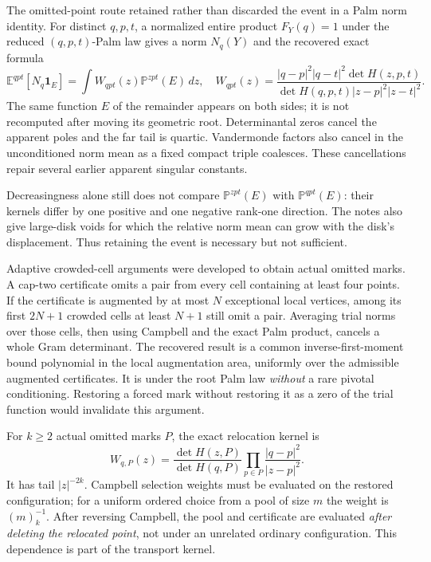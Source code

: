 \documentclass[11pt,a4paper]{article}
\theoremstyle{definition}
\theoremstyle{remark}
\numberwithin{equation}{section}
\begin{document}
The omitted-point route retained rather than discarded the event in a
Palm norm identity.  For distinct $q,p,t$, a normalized entire product
$F_Y(q)=1$ under the reduced $(q,p,t)$-Palm law gives a norm $N_q(Y)$
and the recovered exact formula
\begin{equation}
 \mathbb E^{qpt}[N_q\mathbf1_E]
 =\int W_{qpt}(z)\mathbb P^{zpt}(E)\,dz,
 \quad
 W_{qpt}(z)=
 \frac{|q-p|^2|q-t|^2\det H(z,p,t)}
      {\det H(q,p,t)|z-p|^2|z-t|^2}.
 \label{br:weighted-norm}
\end{equation}
The same function $E$ of the remainder appears on both sides; it is
not recomputed after moving its geometric root.  Determinantal zeros
cancel the apparent poles and the far tail is quartic.  Vandermonde
factors also cancel in the unconditioned norm mean as a fixed compact
triple coalesces.  These cancellations repair several earlier apparent
singular constants.

Decreasingness alone still does not compare
$\mathbb P^{zpt}(E)$ with $\mathbb P^{qpt}(E)$: their kernels differ
by one positive and one negative rank-one direction.  The notes also
give large-disk voids for which the relative norm mean can grow with
the disk's displacement.  Thus retaining the event is necessary but
not sufficient.

Adaptive crowded-cell arguments were developed to obtain actual omitted
marks.  A cap-two certificate omits a pair from every cell containing at
least four points.  If the certificate is augmented by at most $N$
exceptional local vertices, among its first $2N+1$ crowded cells at least
$N+1$ still omit a pair.  Averaging trial norms over those cells, then
using Campbell and the exact Palm product, cancels a whole Gram
determinant.  The recovered result is a common inverse-first-moment
bound polynomial in the local augmentation area, uniformly over the
admissible augmented certificates.  It is under the root Palm law
\emph{without} a rare pivotal conditioning.  Restoring a forced mark
without restoring it as a zero of the trial function would invalidate
this argument.

For $k\geq2$ actual omitted marks $P$, the exact relocation kernel is
\[
 W_{q,P}(z)=\frac{\det H(z,P)}{\det H(q,P)}
        \prod_{p\in P}\frac{|q-p|^2}{|z-p|^2}.
\]
It has tail $|z|^{-2k}$.  Campbell selection weights must be evaluated
on the restored configuration; for a uniform ordered choice from a
pool of size $m$ the weight is $(m)_k^{-1}$.  After reversing Campbell,
the pool and certificate are evaluated \emph{after deleting the
relocated point}, not under an unrelated ordinary configuration.
This dependence is part of the transport kernel.
\end{document}
